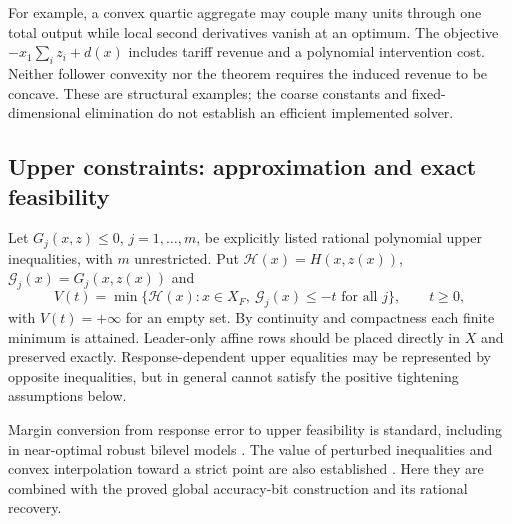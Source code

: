 For example, a convex quartic aggregate may couple many units through
one total output while local second derivatives vanish at an optimum.
The objective $-x_1\sum_i z_i+d(x)$ includes tariff revenue and a
polynomial intervention cost. Neither follower convexity nor the theorem
requires the induced revenue to be concave. These are structural examples;
the coarse constants and fixed-dimensional elimination do not establish
an efficient implemented solver.

\subsection{Upper constraints: approximation and exact feasibility}
\label{subsec:accuracy-upper}

Let $G_j(x,z)\le0$, $j=1,\ldots,m$, be explicitly listed rational
polynomial upper inequalities, with $m$ unrestricted. Put
$\mathcal H(x)=H(x,z(x))$, $\mathcal G_j(x)=G_j(x,z(x))$ and
\begin{equation}\label{eq:tightened-value}
 V(t)=\min\{\mathcal H(x):x\in X_F,\ \mathcal G_j(x)\le-t
                  \text{ for all }j\},\qquad t\ge0,
\end{equation}
with $V(t)=+\infty$ for an empty set. By continuity and compactness
each finite minimum is attained. Leader-only affine rows should be
placed directly in $X$ and preserved exactly. Response-dependent
upper equalities may be represented by opposite inequalities, but in
general cannot satisfy the positive tightening assumptions below.

Margin conversion from response error to upper feasibility is standard,
including in near-optimal robust bilevel models
\cite{BesanconAnjosBrotcorne2024}. The value of perturbed inequalities
and convex interpolation toward a strict point are also established
\cite[Section 5.6]{BoydVandenberghe2004}. Here they are combined with
the proved global accuracy-bit construction and its rational recovery.

